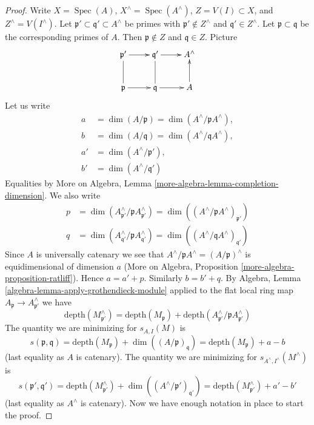 \documentclass{stacks-project}
\theoremstyle{plain}
\theoremstyle{definition}
\theoremstyle{remark}
\numberwithin{equation}{subsection}
\def\Spec{\mathop{\mathrm{Spec}}}
\begin{document}
\begin{proof}
Write $X = \Spec(A)$, $X^\wedge = \Spec(A^\wedge)$, $Z = V(I) \subset X$, and
$Z^\wedge = V(I^\wedge)$.
Let $\mathfrak p' \subset \mathfrak q' \subset A^\wedge$
be primes with $\mathfrak p' \not \in Z^\wedge$ and
$\mathfrak q' \in Z^\wedge$. Let $\mathfrak p \subset \mathfrak q$
be the corresponding primes of $A$. Then $\mathfrak p \not \in Z$
and $\mathfrak q \in Z$. Picture
$$
\xymatrix{
\mathfrak p' \ar[r] & \mathfrak q' \ar[r] & A^\wedge \\
\mathfrak p \ar[r] \ar@{-}[u] &
\mathfrak q \ar[r] \ar@{-}[u] & A \ar[u]
}
$$
Let us write
\begin{align*}
a & = \dim(A/\mathfrak p) = \dim(A^\wedge/\mathfrak pA^\wedge),\\
b & = \dim(A/\mathfrak q) = \dim(A^\wedge/\mathfrak qA^\wedge),\\
a' & = \dim(A^\wedge/\mathfrak p'),\\
b' & = \dim(A^\wedge/\mathfrak q')
\end{align*}
Equalities by
More on Algebra, Lemma \ref{more-algebra-lemma-completion-dimension}.
We also write
\begin{align*}
p & = \dim(A^\wedge_{\mathfrak p'}/\mathfrak p A^\wedge_{\mathfrak p'}) =
\dim((A^\wedge/\mathfrak p A^\wedge)_{\mathfrak p'}) \\
q & = \dim(A^\wedge_{\mathfrak q'}/\mathfrak p A^\wedge_{\mathfrak q'}) =
\dim((A^\wedge/\mathfrak q A^\wedge)_{\mathfrak q'})
\end{align*}
Since $A$ is universally catenary we see that
$A^\wedge/\mathfrak pA^\wedge = (A/\mathfrak p)^\wedge$
is equidimensional of dimension $a$
(More on Algebra, Proposition \ref{more-algebra-proposition-ratliff}).
Hence $a = a' + p$. Similarly $b = b' + q$.
By Algebra, Lemma \ref{algebra-lemma-apply-grothendieck-module}
applied to the flat local ring map
$A_\mathfrak p \to A^\wedge_{\mathfrak p'}$
we have
$$
\text{depth}(M^\wedge_{\mathfrak p'})
=
\text{depth}(M_\mathfrak p) +
\text{depth}(A^\wedge_{\mathfrak p'} / \mathfrak p A^\wedge_{\mathfrak p'})
$$
The quantity we are minimizing for $s_{A, I}(M)$ is
$$
s(\mathfrak p, \mathfrak q) =
\text{depth}(M_\mathfrak p) + \dim((A/\mathfrak p)_\mathfrak q) =
\text{depth}(M_\mathfrak p) + a - b
$$
(last equality as $A$ is catenary). The quantity we are minimizing
for $s_{A^\wedge, I^\wedge}(M^\wedge)$
is
$$
s(\mathfrak p', \mathfrak q') =
\text{depth}(M^\wedge_{\mathfrak p'}) +
\dim((A^\wedge/\mathfrak p')_{\mathfrak q'}) =
\text{depth}(M^\wedge_{\mathfrak p'}) + a' - b'
$$
(last equality as $A^\wedge$ is catenary).
Now we have enough notation in place to start the proof.


\end{proof}
\end{document}
